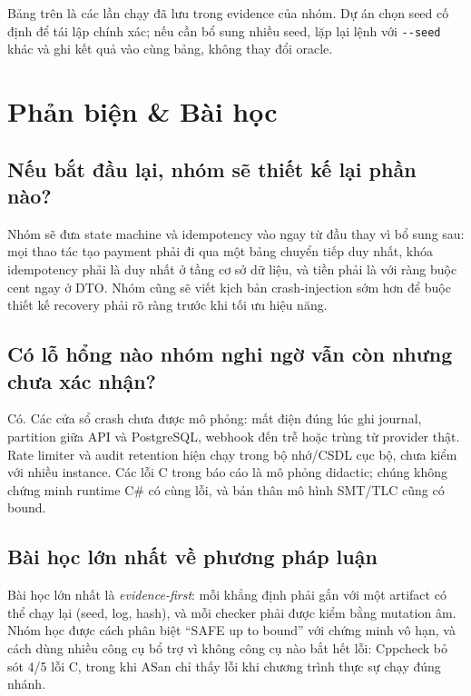 \documentclass[12pt,a4paper]{article}
\newcommand{\cmd}[1]{\texttt{\detokenize{#1}}}
\begin{document}
Bảng trên là các lần chạy đã lưu trong evidence của nhóm. Dự án chọn seed cố định
để tái lập chính xác; nếu cần bổ sung nhiều seed, lặp lại lệnh với
\texttt{-{}-seed} khác và ghi kết quả vào cùng bảng, không thay đổi oracle.

\section{Phản biện \& Bài học}

\subsection{Nếu bắt đầu lại, nhóm sẽ thiết kế lại phần nào?}
Nhóm sẽ đưa state machine và idempotency vào ngay từ đầu thay vì bổ sung sau:
mọi thao tác tạo payment phải đi qua một bảng chuyển tiếp duy nhất, khóa
idempotency phải là duy nhất ở tầng cơ sở dữ liệu, và tiền phải là \cmd{decimal}
với ràng buộc cent ngay ở DTO. Nhóm cũng sẽ viết kịch bản crash-injection sớm hơn
để buộc thiết kế recovery phải rõ ràng trước khi tối ưu hiệu năng.

\subsection{Có lỗ hổng nào nhóm nghi ngờ vẫn còn nhưng chưa xác nhận?}
Có. Các cửa sổ crash chưa được mô phỏng: mất điện đúng lúc ghi journal, partition
giữa API và PostgreSQL, webhook đến trễ hoặc trùng từ provider thật. Rate limiter
và audit retention hiện chạy trong bộ nhớ/CSDL cục bộ, chưa kiểm với nhiều instance.
Các lỗi C trong báo cáo là mô phỏng didactic; chúng không chứng minh runtime C\#
có cùng lỗi, và bản thân mô hình SMT/TLC cũng có bound.

\subsection{Bài học lớn nhất về phương pháp luận}
Bài học lớn nhất là \emph{evidence-first}: mỗi khẳng định phải gắn với một artifact
có thể chạy lại (seed, log, hash), và mỗi checker phải được kiểm bằng mutation âm.
Nhóm học được cách phân biệt ``SAFE up to bound'' với chứng minh vô hạn, và cách
dùng nhiều công cụ bổ trợ vì không công cụ nào bắt hết lỗi: Cppcheck bỏ sót 4/5 lỗi
C, trong khi ASan chỉ thấy lỗi khi chương trình thực sự chạy đúng nhánh.
\end{document}
